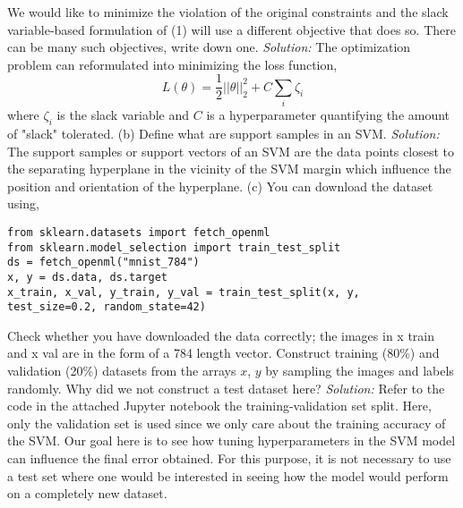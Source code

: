 \documentclass[12pt]{article}
\begin{document}
We would like to minimize the violation of the original constraints and the slack variable-based formulation of (1) will
use a different objective that does so. There can be many such objectives, write down one. \newline  \newline 
\emph{Solution:} 
The optimization problem can reformulated into minimizing the loss function, 
$$  L(\theta)  = \frac{1}{2} ||\theta||_{2}^{2}  + C\sum_{i} \zeta_{i}  $$
where $\zeta_{i}$ is the slack variable and $C$ is a hyperparameter quantifying the amount of "slack" tolerated. \newline  \newline  
(b)  Define what are support samples in an SVM. \newline  \newline  
 \emph{Solution:} 
 The support samples or support vectors of an SVM are the data points closest to the separating hyperplane in the vicinity of the SVM margin which influence the position and orientation of the hyperplane. \newline   \newline  
 (c)   You can download the dataset using,  \newline
\begin{lstlisting}
from sklearn.datasets import fetch_openml
from sklearn.model_selection import train_test_split
ds = fetch_openml("mnist_784")
x, y = ds.data, ds.target
x_train, x_val, y_train, y_val = train_test_split(x, y,
test_size=0.2, random_state=42)
\end{lstlisting}
Check whether you have downloaded the data correctly; the images in x train and x val are in the 
form of a 784 length vector.  Construct training (80\%) and validation (20\%) datasets from the arrays $x$, $y$ by sampling the images and labels randomly. Why did we not construct a test dataset here?
\newline \newline 
\emph{Solution:} 
Refer to the code in the attached Jupyter notebook the training-validation set split. Here, only the validation set is used since we only care about the training accuracy of the SVM. Our goal here is to see how tuning hyperparameters in the SVM model can influence the final error obtained. For this purpose, it is not necessary to use a test set where one would be interested in seeing how the model would perform on a completely new dataset. \newline  \newline  
\end{document}
